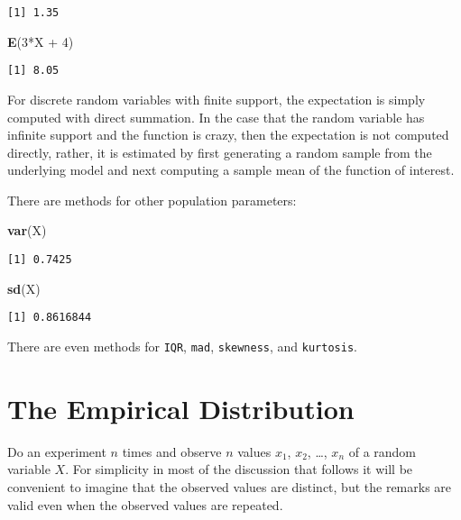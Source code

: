 \documentclass[]{book}
\newenvironment{Shaded}{\begin{snugshade}}{\end{snugshade}}
\newcommand{\KeywordTok}[1]{\textcolor[rgb]{0.13,0.29,0.53}{\textbf{{#1}}}}
\newcommand{\DecValTok}[1]{\textcolor[rgb]{0.00,0.00,0.81}{{#1}}}
\newcommand{\StringTok}[1]{\textcolor[rgb]{0.31,0.60,0.02}{{#1}}}
\newcommand{\NormalTok}[1]{{#1}}
\numberwithin{equation}{chapter}
\numberwithin{figure}{chapter}
\theoremstyle{plain}
\theoremstyle{definition}
\theoremstyle{remark}
\theoremstyle{definition}
\theoremstyle{definition}
\theoremstyle{remark}
\begin{document}
\begin{verbatim}
[1] 1.35
\end{verbatim}

\begin{Shaded}
\begin{Highlighting}[]
\KeywordTok{E}\NormalTok{(}\DecValTok{3}\NormalTok{*X +}\StringTok{ }\DecValTok{4}\NormalTok{)}
\end{Highlighting}
\end{Shaded}

\begin{verbatim}
[1] 8.05
\end{verbatim}

For discrete random variables with finite support, the expectation is
simply computed with direct summation. In the case that the random
variable has infinite support and the function is crazy, then the
expectation is not computed directly, rather, it is estimated by first
generating a random sample from the underlying model and next computing
a sample mean of the function of interest.

There are methods for other population parameters:

\begin{Shaded}
\begin{Highlighting}[]
\KeywordTok{var}\NormalTok{(X)}
\end{Highlighting}
\end{Shaded}

\begin{verbatim}
[1] 0.7425
\end{verbatim}

\begin{Shaded}
\begin{Highlighting}[]
\KeywordTok{sd}\NormalTok{(X)}
\end{Highlighting}
\end{Shaded}

\begin{verbatim}
[1] 0.8616844
\end{verbatim}

There are even methods for \texttt{IQR}, \texttt{mad},
\texttt{skewness}, and \texttt{kurtosis}.

\section{The Empirical Distribution}\label{sec-empirical-distribution}

Do an experiment \(n\) times and observe \(n\) values \(x_{1}\),
\(x_{2}\), \ldots{}, \(x_{n}\) of a random variable \(X\). For
simplicity in most of the discussion that follows it will be convenient
to imagine that the observed values are distinct, but the remarks are
valid even when the observed values are repeated.
\end{document}
